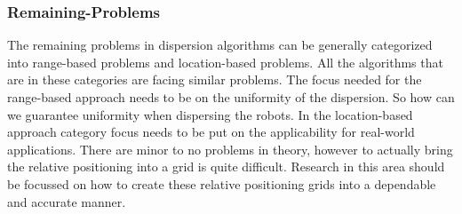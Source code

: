 \subsubsection{Remaining-Problems}
The remaining problems in dispersion algorithms can be generally categorized into range-based problems and location-based problems.
All the algorithms that are in these categories are facing similar problems.
The focus needed for the range-based approach needs to be on the uniformity of the dispersion. So how can we guarantee uniformity when dispersing the robots.
In the location-based approach category focus needs to be put on the applicability for real-world applications.
There are minor to no problems in theory, however to actually bring the relative positioning into a grid is quite difficult.
Research in this area should be focussed on how to create these relative positioning grids into a dependable and accurate manner.
